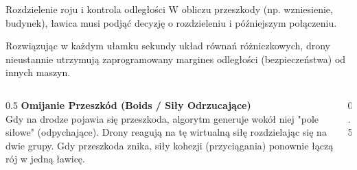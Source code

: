 \begin{frame}{Rozdzielenie roju i kontrola odległości}
    W obliczu przeszkody (np. wzniesienie, budynek), ławica musi podjąć decyzję o rozdzieleniu i późniejszym połączeniu.
    
    \vspace{0.3cm}
    Rozwiązując w każdym ułamku sekundy układ równań różniczkowych, drony nieustannie utrzymują zaprogramowany margines odległości (bezpieczeństwa) od innych maszyn.
    
    \begin{columns}
        \begin{column}{0.5\textwidth}
            \small
            \textbf{Omijanie Przeszkód (Boids / Siły Odrzucające)} \\
            Gdy na drodze pojawia się przeszkoda, algorytm generuje wokół niej "pole siłowe" (odpychające). 
            Drony reagują na tę wirtualną siłę rozdzielając się na dwie grupy. 
            Gdy przeszkoda znika, siły kohezji (przyciągania) ponownie łączą rój w jedną ławicę.
        \end{column}
        \begin{column}{0.5\textwidth}
            \begin{center}
            \end{center}
        \end{column}
    \end{columns}
\end{frame}
